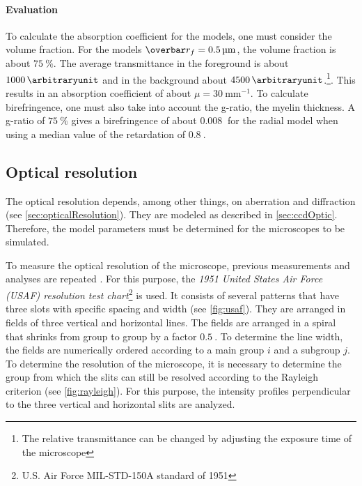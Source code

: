 \paragraph{Evaluation}
To calculate the absorption coefficient for the models, one must consider the volume fraction.
For the models $\fiberRadiusMean = \SI{0.5}{\micro\meter}$, the volume fraction is about $\SI{75}{\percent}$.
The average transmittance in the foreground is about $\SI{1000}{\arbitraryunit}$ and in the background about $\SI{4500}{\arbitraryunit}$.\footnote{The relative transmittance can be changed by adjusting the exposure time of the microscope}.
This results in an absorption coefficient of about $\mu = \SI{30}{\milli\meter\tothe{-1}}$.
To calculate birefringence, one must also take into account the g-ratio, \ie{} the myelin thickness.
A g-ratio of $\SI{75}{\percent}$ gives a birefringence of about $\SI{0.008}{}$ for the radial model when using a median value of the retardation of $\SI{0.8}{}$.
%
% 
% 
\subsection{Optical resolution}
%
The optical resolution depends, among other things, on aberration and diffraction (see \cref{sec:opticalResolution}).
They are modeled as described in \cref{sec:ccdOptic}.
Therefore, the model parameters must be determined for the microscopes to be simulated.
\par
%
To measure the optical resolution of the microscope, previous measurements and analyses are repeated \cite{MenzelMaster}.
For this purpose, the \textit{1951 United States Air Force (USAF) resolution test chart}\footnote{U.S. Air Force MIL-STD-150A standard of 1951} is used.
It consists of several patterns that have three slots with specific spacing and width (see \cref{fig:usaf}).
They are arranged in fields of three vertical and horizontal lines.
The fields are arranged in a spiral that shrinks from group to group by a factor $\SI{0.5}{}$.
To determine the line width, the fields are numerically ordered according to a main group $i$ and a subgroup $j$.
To determine the resolution of the microscope, it is necessary to determine the group from which the slits can still be resolved according to the Rayleigh criterion (see \cref{fig:rayleigh}).
For this purpose, the intensity profiles perpendicular to the three vertical and horizontal slits are analyzed.
% 
